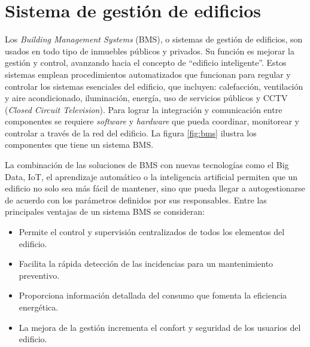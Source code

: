 





\section{Sistema de gestión de edificios}
Los \emph{Building Management Systems} (BMS), o sistemas de gestión de edificios, son usados en todo tipo de inmuebles públicos y privados. Su función es mejorar la gestión y control, avanzando hacia el concepto de ``edificio inteligente''. Estos sistemas emplean procedimientos automatizados que funcionan para regular y controlar los sistemas esenciales del edificio, que incluyen: calefacción, ventilación y aire acondicionado, iluminación, energía, uso de servicios públicos y CCTV (\emph{Closed Circuit Television}). Para lograr la integración y comunicación entre componentes se requiere \emph{software} y \emph{hardware} que pueda coordinar, monitorear y controlar a través de la red del edificio. La figura \ref{fig:bms}  ilustra los componentes que tiene un sistema BMS.

La combinación de las soluciones de BMS con nuevas tecnologías como el Big Data, IoT, el aprendizaje automático o la inteligencia artificial permiten que un edificio no solo sea más fácil de mantener, sino que pueda llegar a autogestionarse de acuerdo con los parámetros definidos por sus responsables. Entre las principales ventajas de un sistema BMS se consideran:

\vspace{0.25cm}
\begin{itemize}
\item Permite el control y supervisión centralizados de todos los elementos del edificio.
\item Facilita la rápida detección de las incidencias para un mantenimiento preventivo.
\item Proporciona información detallada del consumo que fomenta la eficiencia energética.
\item La mejora de la gestión incrementa el confort y seguridad de los usuarios del edificio.
\end{itemize} 


